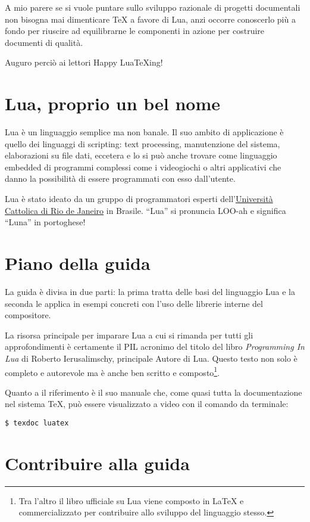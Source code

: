 A mio parere se si vuole puntare sullo sviluppo razionale di progetti
documentali non bisogna mai dimenticare \TeX{} a favore di Lua, anzi occorre
conoscerlo più a fondo per riuscire ad equilibrarne le componenti in azione per
costruire documenti di qualità.

Auguro perciò ai lettori Happy LuaTeXing!


\section{Lua, proprio un bel nome}

Lua è un linguaggio semplice ma non banale. Il suo ambito di applicazione è
quello dei linguaggi di scripting: text processing, manutenzione del sistema,
elaborazioni su file dati, eccetera e lo si può anche trovare come linguaggio
embedded di programmi complessi come i videogiochi o altri applicativi
che danno la possibilità di essere programmati con esso dall'utente.

Lua è stato ideato da un gruppo di programmatori esperti
dell'\href{http://www.puc-rio.br/index.html}{Università Cattolica di Rio de
Janeiro} in Brasile. ``Lua'' si pronuncia LOO-ah e significa ``Luna'' in
portoghese!


\section{Piano della guida}

La guida è divisa in due parti: la prima tratta delle basi del linguaggio Lua e
la seconda le applica in esempi concreti con l'uso delle librerie interne del
compositore.

La risorsa principale per imparare Lua a cui si rimanda per tutti gli
approfondimenti è certamente il PIL acronimo del titolo del libro
\emph{Programming In Lua} di Roberto Ierusalimschy, principale Autore
di Lua. Questo testo non solo è completo e autorevole ma è anche ben scritto e
composto\footnote{Tra l'altro il libro ufficiale su Lua viene composto in
\LaTeX{} e commercializzato per contribuire allo sviluppo del linguaggio
stesso.}.

Quanto a \LuaTeX{} il riferimento è il suo manuale che, come quasi tutta la
documentazione nel sistema \TeX{}, può essere visualizzato a video con il
comando da terminale:
\begin{Verbatim}
$ texdoc luatex
\end{Verbatim}


\section{Contribuire alla guida}

